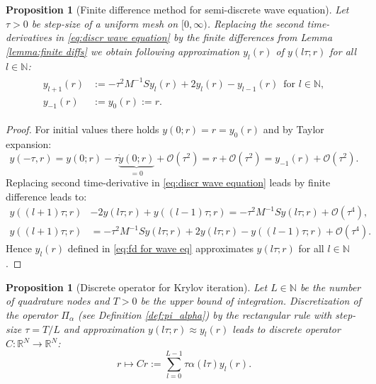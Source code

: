 \documentclass[a4paper,11pt,bibliography=totoc,listof=totoc,headinclude=true,cleardoublepage=empty,oneside]{scrbook}
\newtheorem{prop}[theorem]{Proposition}
\newcommand{\R}{\mathbb{R}}
\newcommand{\N}{\mathbb{N}}
\newcommand{\bigO}{\mathcal{O}}
\begin{document}
\begin{prop}[Finite difference method for semi-discrete wave equation]
    Let $\tau>0$ be step-size of a uniform mesh on $[0, \infty)$. Replacing the second time-derivatives in \eqref{eq:discr wave equation} by the finite differences from Lemma \ref{lemma:finite diffs} we obtain following approximation $y_l(r)$ of $y(l\tau; r)$ for all $l \in \N$:
    \begin{align}\label{eq:fd for wave eq}
    \begin{split}
        y_{l+1}(r) &:= -\tau^2M^{-1}S y_l(r) + 2y_l(r) - y_{l-1}(r) \, \text{ for } l \in \N, \\
        y_{-1}(r) &:= y_0(r) := r.
    \end{split}
    \end{align}
\end{prop}
\begin{proof}
    For initial values there holds $y(0; r) = r = y_0(r)$ and by Taylor expansion:
    \begin{equation*}
        y(-\tau, r) = y(0; r) - \tau \underbrace{\dot{y}(0; r)}_{=0} + \bigO(\tau^2) = r + \bigO(\tau^2) = y_{-1}(r) + \bigO(\tau^2).
    \end{equation*} 
    Replacing second time-derivative in \eqref{eq:discr wave equation} leads by finite difference leads to:
    \begin{align*}
        y((l+1)\tau; r) &- 2 y(l\tau; r) + y((l-1)\tau; r) = -\tau^2 M^{-1}S y(l\tau; r) + \bigO(\tau^4), \\
        y((l+1)\tau; r) &= -\tau^2 M^{-1}S y(l\tau; r) + 2y(l\tau; r) - y((l-1)\tau; r) + \bigO(\tau^4).
    \end{align*}
    Hence $y_l(r)$ defined in \eqref{eq:fd for wave eq} approximates $y(l\tau; r)$ for all $l \in \N$.
\end{proof}

\begin{prop}[Discrete operator for Krylov iteration]\label{prop:C operator}
    Let $L \in \N$ be the number of quadrature nodes and $T>0$ be the upper bound of integration. Discretization of the operator $\Pi_\alpha$ (see Definition \ref{def:pi_alpha}) by the rectangular rule with step-size $\tau = T/L$ and approximation $y(l\tau; r) \approx y_l(r)$ leads to discrete operator $C : \R^N \rightarrow \R^N$:
    \begin{equation}\label{eq:C operator}
        r \mapsto Cr := \sum_{l=0}^{L-1} \tau \alpha(l\tau) y_l(r).
    \end{equation}
\end{prop}
\end{document}
